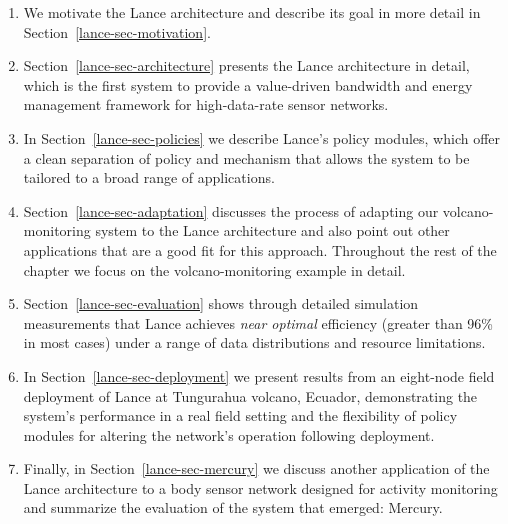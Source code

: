 \begin{enumerate}

\item We motivate the Lance architecture and describe its goal in more detail
in Section~\ref{lance-sec-motivation}.

\item Section~\ref{lance-sec-architecture} presents the Lance architecture in
detail, which is the first system to provide a value-driven bandwidth and
energy management framework for high-data-rate sensor networks.

\item In Section~\ref{lance-sec-policies} we describe Lance's policy modules,
which offer a clean separation of policy and mechanism that allows the system
to be tailored to a broad range of applications.

\item Section~\ref{lance-sec-adaptation} discusses the process of
adapting our volcano-monitoring system to the Lance architecture and also
point out other applications that are a good fit for this approach.
Throughout the rest of the chapter we focus on the volcano-monitoring example
in detail.

\item Section~\ref{lance-sec-evaluation} shows through detailed simulation
measurements that Lance achieves \textit{near optimal} efficiency (greater
than 96\% in most cases) under a range of data distributions and resource
limitations.

\item In Section~\ref{lance-sec-deployment} we present results from an
eight-node field deployment of Lance at Tungurahua volcano, Ecuador,
demonstrating the system's performance in a real field setting and the
flexibility of policy modules for altering the network's operation following
deployment.

\item Finally, in Section~\ref{lance-sec-mercury} we discuss another
application of the Lance architecture to a body sensor network designed for
activity monitoring and summarize the evaluation of the system that emerged:
Mercury.

\end{enumerate}
